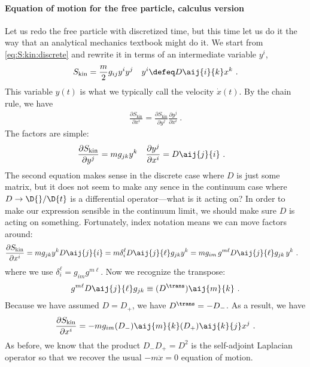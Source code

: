 \paragraph{Equation of motion for the free particle, calculus version}
Let us redo the free particle with discretized time, but this time let us do it the way that an analytical mechanics textbook might do it. We start from \eqref{eq:S:kin:discrete} and rewrite it in terms of an intermediate variable $y^i$,
\begin{align}
    S_\text{kin} &= \frac{m}{2}g_{ij} y^i y^j
    &
    y^i\defeq D\aij{i}{k} x^k \ .
\end{align}
This variable $y(t)$ is what we typically call the velocity $\dot x(t)$. By the chain rule, we have
\begin{align}
    \frac{ \partial S_\text{kin} }{ \partial x^i }
    =
    \frac{ \partial S_\text{kin} }{ \partial y^j }
    \frac{ \partial y^j }{ \partial x^i } \ .
\end{align}
The factors are simple:
\begin{align}
    \frac{ \partial S_\text{kin} }{ \partial y^j }
    &= m g_{jk} y^k
    &
    \frac{ \partial y^j }{ \partial x^i }
    &=
    D\aij{j}{i}
    \ .
\end{align}
The second equation makes sense in the discrete case where $D$ is just some matrix, but it does not seem to make any sence in the continuum case where $D\to \D{}/\D{t}$ is a differential operator---what is it acting on? In order to make our expression sensible in the continuum limit, we should make sure $D$ is acting on something. Fortunately, index notation means we can move factors around:
\begin{align}
    \frac{ \partial S_\text{kin} }{ \partial x^i }
    &=
    m g_{jk} y^k
    D\aij{j}{i}
    =
    m 
    \delta^\ell_i
    D\aij{j}{\ell} g_{jk} y^k
    = 
    m g_{im}\, g^{m\ell} D\aij{j}{\ell} g_{jk} \, y^k \ .
\end{align}
where we use $\delta^\ell_i = g_{im} g^{m\ell}$. Now we recognize the transpose: 
\begin{align}
    g^{m\ell} D\aij{j}{\ell} g_{jk} \equiv (D^\trans)\aij{m}{k}
    \ .
\end{align}
Because we have assumed $D=D_+$, we  have $D^\trans = - D_-$. As a result, we have
\begin{align}
    \frac{ \partial S_\text{kin} }{ \partial x^i }
    = - m g_{im} (D_-)\aij{m}{k} (D_+)\aij{k}{j} x^j \ .
\end{align}
As before, we know that the product $D_-D_+ = D^2$ is the self-adjoint Laplacian operator so that we recover the usual $-m\ddot{x} = 0$ equation of motion. 

